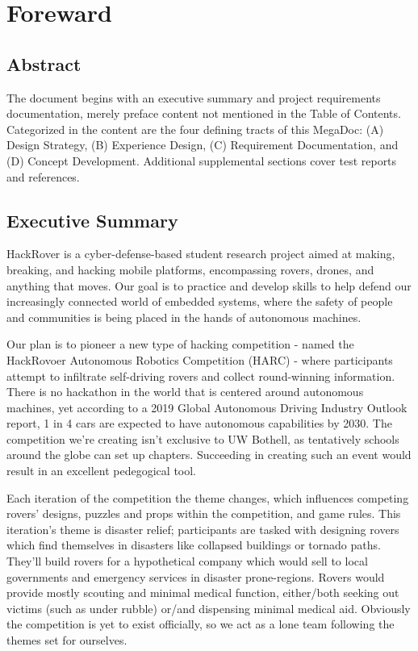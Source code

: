 \documentclass[a4paper, 10pt]{article}
\begin{document}
\begin{titlepage}
\end{titlepage}

\pagebreak{}

\tableofcontents

\pagebreak{}

\section*{Foreward}
	\subsection*{Abstract}
	The document begins with an executive summary and project requirements documentation, merely preface content not mentioned in the Table of Contents. Categorized in the content are the four defining tracts of this MegaDoc: (A) Design Strategy, (B) Experience Design, (C) Requirement Documentation, and (D) Concept Development. Additional supplemental sections cover test reports and references.
	
	\subsection*{Executive Summary}
	HackRover is a cyber-defense-based student research project aimed at making, breaking, and hacking mobile platforms, encompassing rovers, drones, and anything that moves. Our goal is to practice and develop skills to help defend our increasingly connected world of embedded systems, where the safety of people and communities is being placed in the hands of autonomous machines.
	
	Our plan is to pioneer a new type of hacking competition - named the HackRovoer Autonomous Robotics Competition (HARC) - where participants attempt to infiltrate self-driving rovers and collect round-winning information. There is no hackathon in the world that is centered around autonomous machines, yet according to a 2019 Global Autonomous Driving Industry Outlook report, 1 in 4 cars are expected to have autonomous capabilities by 2030. The competition we're creating isn't exclusive to UW Bothell, as tentatively schools around the globe can set up chapters. Succeeding in creating such an event would result in an excellent pedegogical tool. 
	
	Each iteration of the competition the theme changes, which influences competing rovers' designs, puzzles and props within the competition, and game rules. This iteration's theme is disaster relief; participants are tasked with designing rovers which find themselves in disasters like collapsed buildings or tornado paths. They'll build rovers for a hypothetical company which would sell to local governments and emergency services in disaster prone-regions. Rovers would provide mostly scouting and minimal medical function, either/both seeking out victims (such as under rubble) or/and dispensing minimal medical aid. Obviously the competition is yet to exist officially, so we act as a lone team following the themes set for ourselves. 
	
\end{document}
